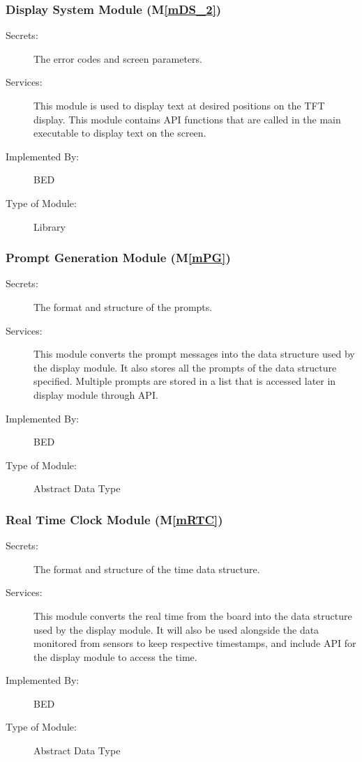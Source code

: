 \documentclass[12pt, titlepage]{article}
\newcommand{\mref}[1]{M\ref{#1}}
\begin{document}
\subsubsection{Display System Module (\mref{mDS_2}) }

\begin{description}
  \item[Secrets:]The error codes and screen parameters.
  \item[Services:] This module is used to display text at desired positions on the TFT display.
    This module contains API functions that are called in the main executable to display text on the screen.
  \item[Implemented By:] BED
  \item[Type of Module:] Library
\end{description}

\subsubsection{Prompt Generation Module (\mref{mPG})}

\begin{description}
  \item[Secrets:]The format and structure of the prompts.
  \item[Services:] This module converts the prompt messages into the data structure used by the
    display module. It also stores all the prompts of the data structure specified. Multiple prompts are stored in a list that is accessed later in display module through API.
  \item[Implemented By:] BED
  \item[Type of Module:] Abstract Data Type
\end{description}

\subsubsection{Real Time Clock Module (\mref{mRTC})}

\begin{description}
  \item[Secrets:]The format and structure of the time data structure.
  \item[Services:] This module converts the real time from the board into the data structure used by the
    display module. It will also be used alongside the data monitored from sensors to keep respective timestamps, and include API for the display module to access the time.
  \item[Implemented By:] BED
  \item[Type of Module:] Abstract Data Type
\end{description}
\end{document}
